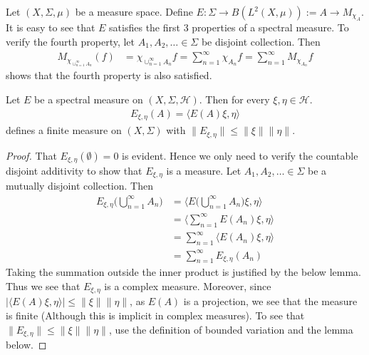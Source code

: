 

\begin{example}
  Let $(X, \Sigma, \mu)$ be a measure space. Define $E : \Sigma \to
  B(L^{2}(X, \mu)):= A \to M_{\chi_A}$. It is easy to see that $E$
  satisfies the first 3 properties of a spectral measure.
  To verify the fourth property, let $A_1 , A_2 , \ldots \in \Sigma$
  be disjoint collection. Then
  \begin{align*}
    M_{\chi_{\cup_{n = 1}^{\infty}A_n}}(f) &= \chi_{\cup_{n =
    1}^{\infty}A_n}f = \sum_{n = 1}^{\infty} \chi_{A_n} f = \sum_{ n
    = 1}^{\infty}  M_{\chi_{A_n}}  f
  \end{align*}
  shows that the fourth property is also satisfied.
\end{example}

\begin{proposition}
  \label{prop:spectral_measure_gives_complex_measure}
  Let $E$ be a spectral measure on $(X, \Sigma, \mathcal{H})$. Then
  for every $\xi, \eta \in \mathcal{H}$.
  \begin{align*}
    E_{\xi, \eta}(A) = \langle  E(A) \xi ,  \eta \rangle
  \end{align*}
  defines a finite measure on $(X, \Sigma)$ with $\|E_{\xi, \eta}\|
  \le \|\xi\| \|\eta\|$.
\end{proposition}
\begin{proof}
  That $E_{\xi, \eta}(\emptyset) = 0$ is evident. Hence we only need
  to verify the countable disjoint additivity to show that $E_{\xi,
  \eta}$ is a measure. Let $A_1 , A_2 , \ldots \in \Sigma$ be a
  mutually disjoint collection. Then
  \begin{align*}
    E_{\xi, \eta} \Big( \bigcup_{n = 1}^{\infty}A_n \Big) &= \Big
    \langle E \Big( \bigcup_{n = 1}^{\infty} A_n \Big) \xi ,  \eta
    \Big \rangle \\
    &= \Big \langle  \sum_{n = 1}^{\infty} E(A_n) \xi ,  \eta
    \Big \rangle \\
    &= \sum_{n = 1}^{\infty} \big \langle E(A_n) \xi, \eta \big \rangle  \\
    &= \sum_{n = 1}^{\infty}  E_{\xi, \eta}(A_n)
  \end{align*}
  Taking the summation outside the inner product is justified by the
  below lemma. Thus we see that $E_{\xi, \eta}$ is a complex measure.
  Moreover, since $|\langle E(A) \xi ,  \eta \rangle| \le \|\xi\|
  \|\eta\|$, as $E(A)$ is a projection, we see that the measure is
  finite (Although this is implicit in complex measures). To see that
  $ \|E_{\xi, \eta}\| \le \|\xi\| \|\eta\|$, use the definition of
  bounded variation and the lemma below.
\end{proof}

